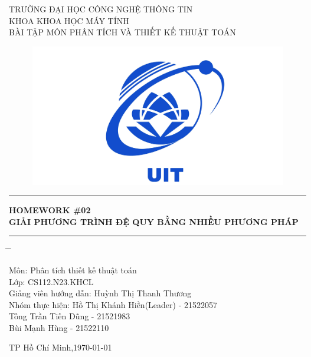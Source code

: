 \documentclass[10pt,a4paper]{article}
\begin{document}
\fontsize{18}{30}\selectfont
{\centering TRƯỜNG ĐẠI HỌC CÔNG NGHỆ THÔNG TIN \\
KHOA KHOA HỌC MÁY TÍNH \\
BÀI TẬP MÔN PHÂN TÍCH VÀ THIẾT KẾ THUẬT TOÁN
\par}
\vspace{0.5 cm}
\begin{center}
    \begin{figure}[htp]
     \centering\includegraphics[scale=.3]{images/logo_uit.jpg} \\
    \end{figure}
    \vspace{1 cm}
    
    \par\noindent\rule{\textwidth}{0.5pt}
    \fontsize{14}{30}\selectfont
    {\centering \textbf{HOMEWORK \#02 \\
    GIẢI PHƯƠNG TRÌNH ĐỆ QUY BẰNG NHIỀU PHƯƠNG PHÁP} \\
    }
    \par\noindent\rule{\textwidth}{0.5pt}
    
    \fontsize{14}{30}\selectfont
    \begin{tabbing}
    \hspace{2 in} \= \hspace{2 in} \= \kill

    Môn: \> Phân tích thiết kế thuật toán \\
    Lớp: \> CS112.N23.KHCL \\
    Giảng viên hướng dẫn: \> Huỳnh Thị Thanh Thương \\
    Nhóm thực hiện: \> Hồ Thị Khánh Hiền(Leader) - 21522057 \\
    \hspace{5.3 cm}Tống Trần Tiến Dũng - 21521983 \\
    \hspace{5.3 cm}Bùi Mạnh Hùng - 21522110 \\
    \end{tabbing}  

    \begin{center}
    \fontsize{14}{30}\selectfont
     TP Hồ Chí Minh,{\today}
    \end{center}
\end{center}
\newpage
\fontsize{13}{15}\selectfont
\tableofcontents
\newpage
\end{document}
